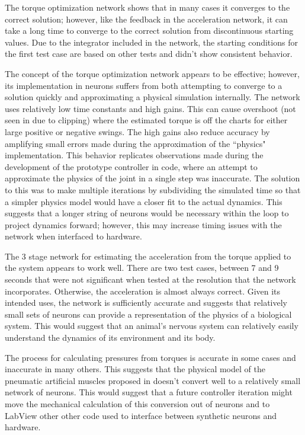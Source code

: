 
The torque optimization network shows that in many cases it converges to the
correct solution; however, like the feedback in the acceleration network, it can
take a long time to converge to the correct solution from discontinuous starting
values. Due to the integrator included in the network, the starting conditions
for the first test case are based on other tests and didn't show consistent
behavior.

The concept of the torque optimization network appears to be effective; however,
its implementation in neurons suffers from both attempting to converge to a
solution quickly and approximating a physical simulation internally. The network
uses relatively low time constants and high gains. This can cause overshoot
(not seen in  due to clipping) where the
estimated torque is off the charts for either large positive or negative swings.
The high gains also reduce accuracy by amplifying small errors made during the
approximation of the ``physics" implementation. This behavior replicates
observations made during the development of the prototype controller in code,
where an attempt to approximate the physics of the joint in a single step was
inaccurate. The solution to this was to make multiple iterations by subdividing
the simulated time so that a simpler physics model would have a closer fit to
the actual dynamics. This suggests that a longer string of neurons would be
necessary within the loop to project dynamics forward; however, this may
increase timing issues with the network when interfaced to hardware.


The 3 stage network for estimating the acceleration from the torque applied to
the system appears to work well. There are two test cases, between 7 and 9
seconds that were not significant when tested at the resolution that the
network incorporates. Otherwise, the acceleration is almost always correct.
Given its intended uses, the network is sufficiently accurate and suggests that
relatively small sets of neurons can provide a representation of the physics of
a biological system. This would suggest that an animal's nervous system can
relatively easily understand the dynamics of its environment and its body.


The process for calculating pressures from torques is accurate in some
cases and inaccurate in many others. This suggests that the physical
model of the pneumatic artificial muscles proposed in \cite{HuntPMuscles}
doesn't convert well to a relatively small network of neurons. This would
suggest that a future controller iteration might move the mechanical
calculation of this conversion out of neurons and
to LabView other other code used to interface between synthetic neurons and
hardware.

